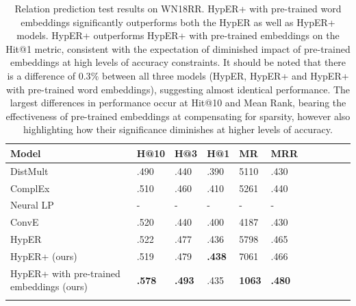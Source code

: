 
\begin{table}
		\centering
		\begin{tabular}{lllllllllll}
  			\textbf{Model} & \textbf{H@10} & \textbf{H@3} & \textbf{H@1} & \textbf{MR} & \textbf{MRR} \\
  			\hline
  			DistMult \unskip~\citep{yang2014embedding} & .490 & .440 & .390 & 5110 & .430 \\
  			ComplEx \unskip~\citep{trouillon2016complex} & .510 & .460 & .410 & 5261 & .440 \\
  			Neural LP \unskip~\citep{yang2017differentiable} & - & - & - & - & - \\
			ConvE \unskip~\citep{dettmers2018convolutional} & .520 & .440 & .400 & 4187 & .430 \\
			HypER \unskip~\citep{balazevic2019hypernetwork} & .522 & .477 & .436 & 5798 & .465 \\
			HypER+ (ours) & .519 & .479 & \textbf{.438} & 7061 & .466 \\
  			\hline
  			HypER+ with pre-trained embeddings (ours) & \textbf{.578} & \textbf{.493} & .435 & \textbf{1063} & \textbf{.480} \\
			&
		\end{tabular}
		\captionsetup{justification=centering}
		\caption{Relation prediction test results on WN18RR. HypER+ with pre-trained word embeddings significantly outperforms both the HypER as well as HypER+ models. HypER+ outperforms HypER+ with pre-trained embeddings on the Hit@1 metric, consistent with the expectation of diminished impact of pre-trained embeddings at high levels of accuracy constraints. It should be noted that there is a difference of $ 0.3 \% $ between all three models (HypER, HypER+ and HypER+ with pre-trained word embeddings), suggesting almost identical performance. The largest differences in performance occur at Hit@10 and Mean Rank, bearing the effectiveness of pre-trained embeddings at compensating for sparsity, however also highlighting how their significance diminishes at higher levels of accuracy. }
\end{table}

